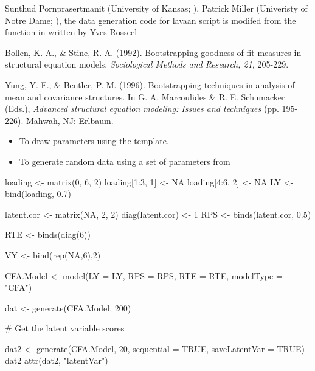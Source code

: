 \documentclass[a4paper]{book}
\begin{document}
%
\begin{Author}\relax
	
Sunthud Pornprasertmanit (University of Kansas; ), Patrick Miller (Univeristy of Notre Dame; ), the data generation code for lavaan script is modifed from the  function in  written by Yves Rosseel
\end{Author}
%
\begin{References}\relax
Bollen, K. A., \& Stine, R. A. (1992). Bootstrapping goodness-of-fit measures in structural equation models. \emph{Sociological Methods and Research, 21,} 205-229.

Yung, Y.-F., \& Bentler, P. M. (1996). Bootstrapping techniques in analysis of mean and covariance structures. In G. A. Marcoulides \& R. E. Schumacker (Eds.), \emph{Advanced structural equation modeling: Issues and techniques} (pp. 195-226). Mahwah, NJ: Erlbaum.
\end{References}
%
\begin{SeeAlso}\relax
\begin{itemize}

\item {} To draw parameters using the  template.
\item {} To generate random data using a set of parameters from 

\end{itemize}

\end{SeeAlso}
%
\begin{Examples}
\begin{ExampleCode}
loading <- matrix(0, 6, 2)
loading[1:3, 1] <- NA
loading[4:6, 2] <- NA
LY <- bind(loading, 0.7)

latent.cor <- matrix(NA, 2, 2)
diag(latent.cor) <- 1
RPS <- binds(latent.cor, 0.5)

RTE <- binds(diag(6))

VY <- bind(rep(NA,6),2)

CFA.Model <- model(LY = LY, RPS = RPS, RTE = RTE, modelType = "CFA")

dat <- generate(CFA.Model, 200)

# Get the latent variable scores

dat2 <- generate(CFA.Model, 20, sequential = TRUE, saveLatentVar = TRUE)
dat2
attr(dat2, "latentVar")
\end{ExampleCode}
\end{Examples}
\end{document}
